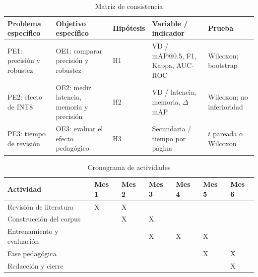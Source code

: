 
\begin{table}[htbp]
  \centering
  \caption{Matriz de consistencia}
  \label{tab:consistencia}
  \small
  \renewcommand{\arraystretch}{1.15}
  \begin{tabularx}{\textwidth}{@{}>{\raggedright\arraybackslash}p{2.6cm}>{\raggedright\arraybackslash}p{2.6cm}>{\raggedright\arraybackslash}p{1.2cm}>{\raggedright\arraybackslash}X>{\raggedright\arraybackslash}p{2.6cm}@{}}
    \toprule
    \textbf{Problema específico} & \textbf{Objetivo específico} & \textbf{Hipótesis} & \textbf{Variable / indicador} & \textbf{Prueba} \\
    \midrule
    PE1: precisión y robustez & OE1: comparar precisión y robustez & H1 & VD / mAP@0.5, F1, Kappa, AUC-ROC & Wilcoxon; bootstrap \\
    PE2: efecto de INT8 & OE2: medir latencia, memoria y precisión & H2 & VD / latencia, memoria, $\Delta$mAP & Wilcoxon; no inferioridad \\
    PE3: tiempo de revisión & OE3: evaluar el efecto pedagógico & H3 & Secundaria / tiempo por página & $t$ pareada o Wilcoxon \\
    \bottomrule
  \end{tabularx}
\end{table}


\begin{table}[htbp]
  \centering
  \caption{Cronograma de actividades}
  \label{tab:cronograma}
  \small
  \begin{tabularx}{\textwidth}{@{}l*{6}{>{\centering\arraybackslash}X}@{}}
    \toprule
    \textbf{Actividad} & \textbf{Mes 1} & \textbf{Mes 2} & \textbf{Mes 3} & \textbf{Mes 4} & \textbf{Mes 5} & \textbf{Mes 6} \\
    \midrule
    Revisión de literatura & X & X & & & & \\
    Construcción del corpus & & X & X & & & \\
    Entrenamiento y evaluación & & & X & X & X & \\
    Fase pedagógica & & & & & X & X \\
    Redacción y cierre & & & & & & X \\
    \bottomrule
  \end{tabularx}
\end{table}


